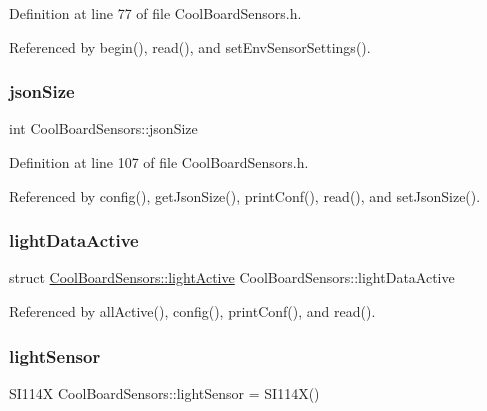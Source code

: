 Definition at line 77 of file Cool\+Board\+Sensors.\+h.



Referenced by begin(), read(), and set\+Env\+Sensor\+Settings().

\mbox{\label{classCoolBoardSensors_a05a40dc80bfff14ffb830f549b876f8d}} 
\subsubsection{\texorpdfstring{json\+Size}{jsonSize}}
{\footnotesize\ttfamily int Cool\+Board\+Sensors\+::json\+Size\hspace{0.3cm}{\ttfamily [private]}}



Definition at line 107 of file Cool\+Board\+Sensors.\+h.



Referenced by config(), get\+Json\+Size(), print\+Conf(), read(), and set\+Json\+Size().

\mbox{\label{classCoolBoardSensors_ac4deb1cf41bac8b91c780c92fab00ba4}} 
\subsubsection{\texorpdfstring{light\+Data\+Active}{lightDataActive}}
{\footnotesize\ttfamily struct \hyperlink{structCoolBoardSensors_1_1lightActive}{Cool\+Board\+Sensors\+::light\+Active} Cool\+Board\+Sensors\+::light\+Data\+Active\hspace{0.3cm}{\ttfamily [private]}}



Referenced by all\+Active(), config(), print\+Conf(), and read().

\mbox{\label{classCoolBoardSensors_a3e397300fb707dd193e909a757bf6102}} 
\subsubsection{\texorpdfstring{light\+Sensor}{lightSensor}}
{\footnotesize\ttfamily S\+I114X Cool\+Board\+Sensors\+::light\+Sensor = S\+I114X()}



